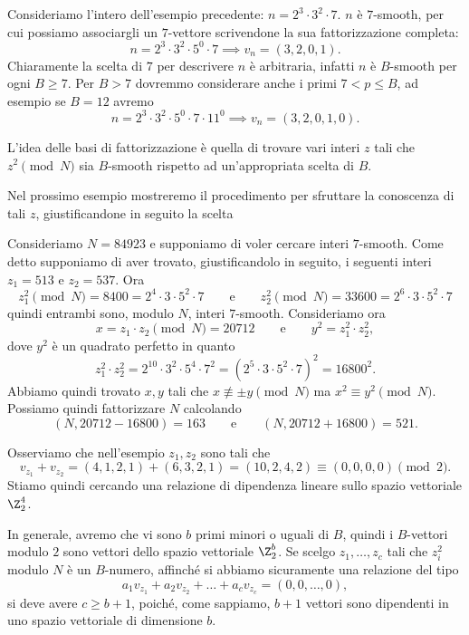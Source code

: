 	\begin{ese}
	Consideriamo l'intero dell'esempio precedente: \(n=2^3 \cdot 3^2 \cdot 7\). \(n\) è \(7\)-smooth, per cui possiamo associargli un \(7\)-vettore scrivendone la sua fattorizzazione completa:
		\[
		n = 2^3 \cdot 3^2 \cdot 5^0 \cdot 7 \implies v_n = (3,2,0,1).
		\]
	Chiaramente la scelta di \(7\) per descrivere \(n\) è arbitraria, infatti \(n\) è \(B\)-smooth per ogni \(B\ge 7\). Per \(B>7\) dovremmo considerare anche i primi \(7<p\le B\), ad esempio se \(B=12\) avremo
		\[
		n = 2^3 \cdot 3^2 \cdot 5^0 \cdot 7 \cdot 11^0 \implies v_n =  (3,2,0,1,0).
		\]
	\end{ese}
	\noindent
	L'idea delle basi di fattorizzazione è quella di trovare vari interi \(z\) tali che \(z^2 \pmod{N}\) sia \(B\)-smooth rispetto ad un'appropriata scelta di \(B\).

	Nel prossimo esempio mostreremo il procedimento per sfruttare la conoscenza di tali \(z\), giustificandone in seguito la scelta

	\begin{ese}
	Consideriamo \(N=84923\) e supponiamo di voler cercare interi \(7\)-smooth.
	Come detto supponiamo di aver trovato, giustificandolo in seguito, i seguenti interi \(z_1=513\) e \(z_2=537\). Ora
		\[
		z_1^2 \pmod{N} = 8400 = 2^4 \cdot 3 \cdot 5^2 \cdot 7 \qquad\text{e}\qquad z_2^2 \pmod{N} = 33600 = 2^6 \cdot 3 \cdot 5^2 \cdot 7
		\]
	quindi entrambi sono, modulo \(N\), interi \(7\)-smooth. Consideriamo ora
		\[
		x = z_1 \cdot z_2 \pmod{N} = 20712 \qquad\text{e}\qquad y^2 = z_1^2 \cdot z_2^2,
		\]
	dove \(y^2\) è un quadrato perfetto in quanto
		\[
		z_1^2 \cdot z_2^2 = 2^{10} \cdot 3^2 \cdot 5^4 \cdot 7^2 = {(2^5 \cdot 3 \cdot 5^2 \cdot 7)}^2 = 16800^2.
		\]
	Abbiamo quindi trovato \(x,y\) tali che \(x\not\equiv \pm y\pmod{N}\) ma \(x^2 \equiv y^2 \pmod{N}\). Possiamo quindi fattorizzare \(N\) calcolando
		\[
		(N,20712-16800) = 163 \qquad\text{e}\qquad (N,20712+16800) = 521.
		\]
	\end{ese}
	\noindent
	Osserviamo che nell'esempio \(z_1,z_2\) sono tali che
		\[
		v_{z_1} + v_{z_2} = (4,1,2,1)+(6,3,2,1) = (10,2,4,2) \equiv (0,0,0,0) \pmod{2}.
		\]
	Stiamo quindi cercando una relazione di dipendenza lineare sullo spazio vettoriale \(\Z_2^4\).

	In generale, avremo che vi sono \(b\) primi minori o uguali di \(B\), quindi i \(B\)-vettori modulo \(2\) sono vettori dello spazio vettoriale \(\Z_2^b\).
	Se scelgo \(z_1,\ldots,z_c\) tali che \(z_i^2\) modulo \(N\) è un \(B\)-numero, affinché si abbiamo sicuramente una relazione del tipo
		\[
		a_1 v_{z_1} + a_2 v_{z_2} + \ldots + a_c v_{z_c} = (0,0, \ldots, 0),
		\]
	si deve avere \(c \ge b+1\), poiché, come sappiamo, \(b+1\) vettori sono dipendenti in uno spazio vettoriale di dimensione \(b\).


